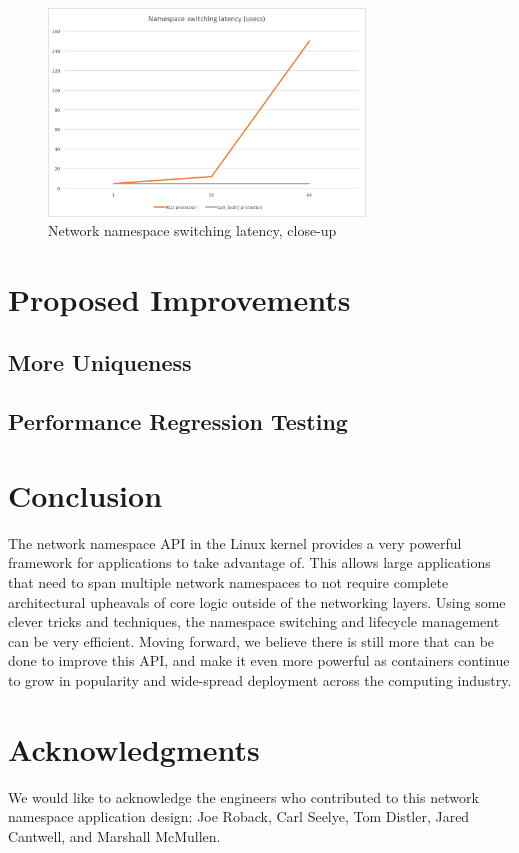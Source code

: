\documentclass[letterpaper]{article}
\begin{document}
\begin{figure}[h]
\includegraphics[width=3.31in]{close-up-latency.png}
\caption{Network namespace switching latency, close-up}
\label{close-latency}
\end{figure}

\section{Proposed Improvements}

\subsection{More Uniqueness}

\subsection{Performance Regression Testing}

\section{Conclusion}
The network namespace API in the Linux kernel provides a very powerful framework for applications to take advantage of. This allows large applications that need to span multiple network namespaces to not require complete architectural upheavals of core logic outside of the networking layers. Using some clever tricks and techniques, the namespace switching and lifecycle management can be very efficient. Moving forward, we believe there is still more that can be done to improve this API, and make it even more powerful as containers continue to grow in popularity and wide-spread deployment across the computing industry.

\section{Acknowledgments}
We would like to acknowledge the engineers who contributed to this network namespace application design: Joe Roback, Carl Seelye, Tom Distler, Jared Cantwell, and Marshall McMullen.
\end{document}
